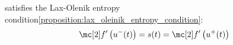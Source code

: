 \begin{corbox}\nospacing
    \begin{cor}\label{cor:lax_olenik_entropy_condition}
         satisfies the Lax-Olenik entropy condition\cref{proposition:lax_oleinik_entropy_condition}:
        \begin{align}
          \flux'\left(u^{-}(t)\right)=s(t)=\flux'\left(u^{+}(t)\right)
        \end{align}
    \end{cor}
\end{corbox}
